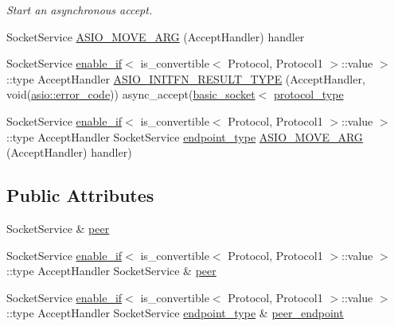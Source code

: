 \begin{DoxyCompactItemize}
\begin{DoxyCompactList}\small\item\em Start an asynchronous accept. \end{DoxyCompactList}\item 
Socket\+Service \hyperlink{classasio_1_1basic__socket__acceptor_a269ee23225f701f85ec0c146838e59dc}{A\+S\+I\+O\+\_\+\+M\+O\+V\+E\+\_\+\+A\+R\+G} (Accept\+Handler) handler
\item 
Socket\+Service \hyperlink{structasio_1_1enable__if}{enable\+\_\+if}$<$ is\+\_\+convertible$<$ Protocol, Protocol1 $>$\+::value $>$\+::type Accept\+Handler \hyperlink{classasio_1_1basic__socket__acceptor_a26f532b3aedc60b441dbc2fc669230fb}{A\+S\+I\+O\+\_\+\+I\+N\+I\+T\+F\+N\+\_\+\+R\+E\+S\+U\+L\+T\+\_\+\+T\+Y\+P\+E} (Accept\+Handler, void(\hyperlink{classasio_1_1error__code}{asio\+::error\+\_\+code})) async\+\_\+accept(\hyperlink{classasio_1_1basic__socket}{basic\+\_\+socket}$<$ \hyperlink{classasio_1_1basic__socket__acceptor_a38f40022b2596eb88875792bd6c0fb21}{protocol\+\_\+type}
\item 
Socket\+Service \hyperlink{structasio_1_1enable__if}{enable\+\_\+if}$<$ is\+\_\+convertible$<$ Protocol, Protocol1 $>$\+::value $>$\+::type Accept\+Handler Socket\+Service \hyperlink{classasio_1_1basic__socket__acceptor_a393d69e2f8a370aaa13a9018af4c0048}{endpoint\+\_\+type} \hyperlink{classasio_1_1basic__socket__acceptor_a69621dfd93fce3593e0d0dbdf0eee443}{A\+S\+I\+O\+\_\+\+M\+O\+V\+E\+\_\+\+A\+R\+G} (Accept\+Handler) handler)
\end{DoxyCompactItemize}
\subsection*{Public Attributes}
\begin{DoxyCompactItemize}
\item 
Socket\+Service \& \hyperlink{classasio_1_1basic__socket__acceptor_a140464f59d688d964abf760d11b30f94}{peer}
\item 
Socket\+Service \hyperlink{structasio_1_1enable__if}{enable\+\_\+if}$<$ is\+\_\+convertible$<$ Protocol, Protocol1 $>$\+::value $>$\+::type Accept\+Handler Socket\+Service \& \hyperlink{classasio_1_1basic__socket__acceptor_a30b2ea172c3889eb87ddb8ab5be95c0a}{peer}
\item 
Socket\+Service \hyperlink{structasio_1_1enable__if}{enable\+\_\+if}$<$ is\+\_\+convertible$<$ Protocol, Protocol1 $>$\+::value $>$\+::type Accept\+Handler Socket\+Service \hyperlink{classasio_1_1basic__socket__acceptor_a393d69e2f8a370aaa13a9018af4c0048}{endpoint\+\_\+type} \& \hyperlink{classasio_1_1basic__socket__acceptor_a9d2810f536fb7c7ad036abadb5750ce7}{peer\+\_\+endpoint}
\end{DoxyCompactItemize}
